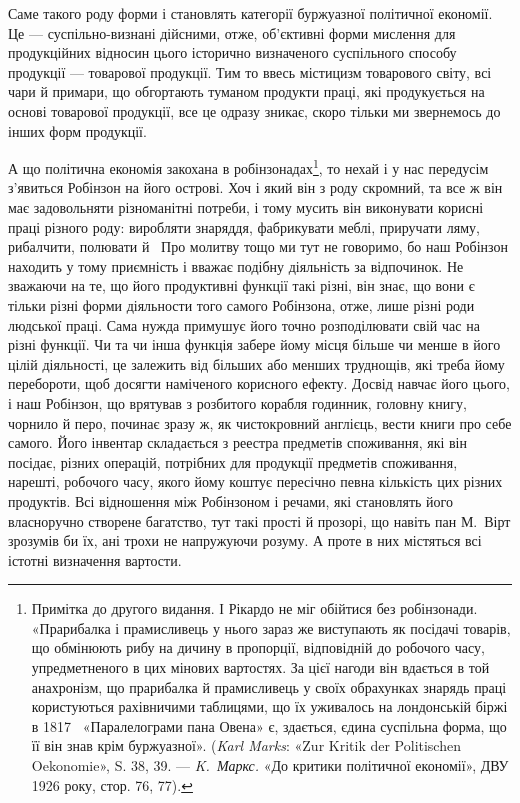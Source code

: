 Саме такого роду форми і становлять категорії буржуазної
політичної економії. Це — суспільно-визнані дійсними, отже,
об’єктивні форми мислення для продукційних відносин цього
історично визначеного суспільного способу продукції — товарової
продукції. Тим то ввесь містицизм товарового світу, всі чари й
примари, що обгортають туманом продукти праці, які продукується
на основі товарової продукції, все це одразу зникає, скоро
тільки ми звернемось до інших форм продукції.

А що політична економія закохана в робінзонадах\footnote{
Примітка до другого видання. І Рікардо не міг обійтися без робінзонади.
«Прарибалка і прамисливець у нього зараз же виступають
як посідачі товарів, що обмінюють рибу на дичину в пропорції, відповідній
до робочого часу, упредметненого в цих мінових вартостях. За цієї
нагоди він вдається в той анахронізм, що прарибалка й прамисливець
у своїх обрахунках знарядь праці користуються рахівничими таблицями,
що їх уживалось на лондонській біржі в 1817~ «Паралелограми пана
Овена» є, здається, єдина суспільна форма, що її він знав крім буржуазної».
(\emph{Karl Marks}: «Zur Kritik der Politischen Oekonomie», S. 38, 39. —
\emph{K.~Маркс.} «До критики політичної економії», ДВУ 1926 року,
стор. 76, 77).
}, то нехай
і у нас передусім з’явиться Робінзон на його острові. Хоч і який
він з роду скромний, та все ж він має задовольняти різноманітні
потреби, і тому мусить він виконувати корисні праці різного
роду: виробляти знаряддя, фабрикувати меблі, приручати ляму,
рибалчити, полювати й~ Про молитву тощо ми тут не говоримо,
бо наш Робінзон находить у тому приємність і вважає подібну
діяльність за відпочинок. Не зважаючи на те, що його продуктивні
функції такі різні, він знає, що вони є тільки різні форми
діяльности того самого Робінзона, отже, лише різні роди людської
праці. Сама нужда примушує його точно розподілювати свій час
на різні функції. Чи та чи інша функція забере йому місця більше
чи менше в його цілій діяльності, це залежить від більших або
менших труднощів, які треба йому перебороти, щоб досягти наміченого
корисного ефекту. Досвід навчає його цього, і наш Робінзон,
що врятував з розбитого корабля годинник, головну книгу,
чорнило й перо, починає зразу ж, як чистокровний англієць, вести
книги про себе самого. Його інвентар складається з реестра предметів
споживання, які він посідає, різних операцій, потрібних для
продукції предметів споживання, нарешті, робочого часу, якого
йому коштує пересічно певна кількість цих різних продуктів. Всі
відношення між Робінзоном і речами, які становлять його власноручно
створене багатство, тут такі прості й прозорі, що навіть
пан М.~Вірт зрозумів би їх, ані трохи не напружуючи розуму.
А проте в них містяться всі істотні визначення вартости.

